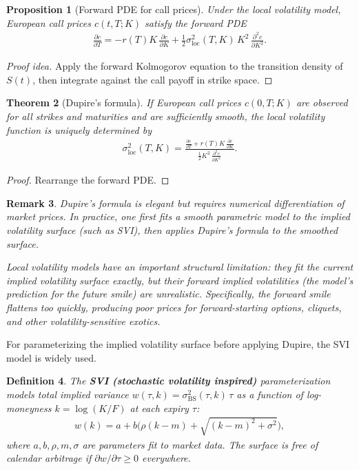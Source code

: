\documentclass{report}
\theoremstyle{spacedplain}
\newtheorem{theorem}{Theorem}[section]
\newtheorem{proposition}[theorem]{Proposition}
\theoremstyle{spaceddefinition}
\newtheorem{definition}[theorem]{Definition}
\theoremstyle{spacedremark}
\newtheorem{remark}[theorem]{Remark}
\begin{document}
\begin{proposition}[Forward PDE for call prices]
Under the local volatility model, European call prices $c(t, T; K)$ satisfy the forward PDE
\begin{align}
    \frac{\partial c}{\partial T} = -r(T)K\,\frac{\partial c}{\partial K} + \frac{1}{2}\sigma_{\text{loc}}^2(T,K)\,K^2\,\frac{\partial^2 c}{\partial K^2}.
\end{align}
\end{proposition}

\begin{proof}[Proof idea]
Apply the forward Kolmogorov equation to the transition density of $S(t)$, then integrate against the call payoff in strike space.
\end{proof}

\begin{theorem}[Dupire's formula]
If European call prices $c(0,T; K)$ are observed for all strikes and maturities and are sufficiently smooth, the local volatility function is uniquely determined by
\begin{align}
    \sigma_{\text{loc}}^2(T,K) = \frac{\frac{\partial c}{\partial T} + r(T)K\,\frac{\partial c}{\partial K}}{\frac{1}{2}K^2\,\frac{\partial^2 c}{\partial K^2}}.
\end{align}
\end{theorem}

\begin{proof}
Rearrange the forward PDE.
\end{proof}

\begin{remark}
Dupire's formula is elegant but requires numerical differentiation of market prices. In practice, one first fits a smooth parametric model to the implied volatility surface (such as SVI), then applies Dupire's formula to the smoothed surface.

Local volatility models have an important structural limitation: they fit the current implied volatility surface exactly, but their forward implied volatilities (the model's prediction for the future smile) are unrealistic. Specifically, the forward smile flattens too quickly, producing poor prices for forward-starting options, cliquets, and other volatility-sensitive exotics.
\end{remark}

For parameterizing the implied volatility surface before applying Dupire, the SVI model is widely used.

\begin{definition}
The \textbf{SVI (stochastic volatility inspired)} parameterization models total implied variance $w(\tau,k) = \sigma_{\text{BS}}^2(\tau,k)\,\tau$ as a function of log-moneyness $k = \log(K/F)$ at each expiry $\tau$:
\begin{align}
    w(k) = a + b\bigl(\rho(k-m) + \sqrt{(k-m)^2 + \sigma^2}\bigr),
\end{align}
where $a, b, \rho, m, \sigma$ are parameters fit to market data. The surface is free of calendar arbitrage if $\partial w/\partial \tau \geq 0$ everywhere.
\end{definition}
\end{document}
